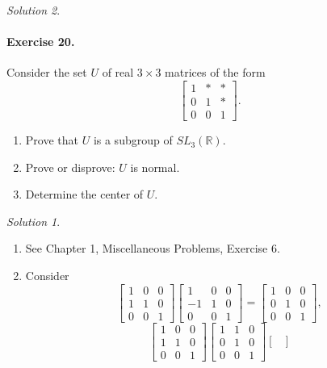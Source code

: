 \documentclass[11pt]{report}
\def\R{\mathbb{R}}
\theoremstyle{remark}
\newtheorem*{solution}{Solution}
\begin{document}
\begin{solution}
    \paragraph{Exercise 20.} Consider the set $U$ of real $3\times 3$ matrices of
    the form \[
        \begin{bmatrix}
            1 & * & * \\ 0 & 1 & * \\ 0 & 0 & 1
        \end{bmatrix}.
    \]
    \begin{enumerate}
        \itemsep0em
        \item Prove that $U$ is a subgroup of $SL_3(\R)$.
        \item Prove or disprove: $U$ is normal.
        \item Determine the center of $U$.
    \end{enumerate}
    \begin{solution} \mbox{}
    \begin{enumerate}
        \itemsep0em
        \item See Chapter 1, Miscellaneous Problems, Exercise 6.
        \item Consider \[
            \begin{bmatrix}
                1 & 0 & 0 \\ 1 & 1 & 0 \\ 0 & 0 & 1
            \end{bmatrix} \begin{bmatrix}
                1 & 0 & 0 \\ -1 & 1 & 0 \\ 0 & 0 & 1
            \end{bmatrix} = \begin{bmatrix}
                1 & 0 & 0 \\ 0 & 1 & 0 \\ 0 & 0 & 1
            \end{bmatrix},
        \] \[
             \begin{bmatrix}
                1 & 0 & 0 \\ 1 & 1 & 0 \\ 0 & 0 & 1
            \end{bmatrix} \begin{bmatrix}
                1 & 1 & 0 \\ 0 & 1 & 0 \\ 0 & 0 & 1
            \end{bmatrix}\begin{bmatrix}

\end{bmatrix}\]
\end{enumerate}
\end{solution}
\end{solution}
\end{document}
